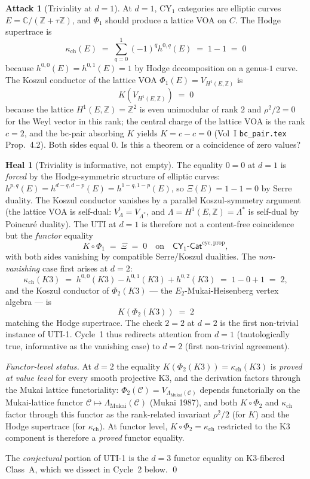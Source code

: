 \documentclass[11pt]{article}
\theoremstyle{definition}
\newtheorem{attack}[theorem]{Attack}
\newtheorem{heal}[theorem]{Heal}
\newcommand{\kch}{\kappa_{\mathrm{ch}}}
\begin{document}
\begin{attack}[Triviality at $d = 1$]
At $d = 1$, CY$_1$ categories are elliptic curves $E = \mathbb{C}/(\mathbb{Z}
+ \tau \mathbb{Z})$, and $\Phi_1$ should produce a lattice VOA on $C$.
The Hodge supertrace is
\[
   \kch(E) \;=\; \sum_{q=0}^{1} (-1)^q h^{0,q}(E)
           \;=\; 1 - 1 \;=\; 0
\]
because $h^{0,0}(E) = h^{0,1}(E) = 1$ by Hodge decomposition on a genus-$1$
curve. The Koszul conductor of the lattice VOA $\Phi_1(E) =
V_{H^1(E, \mathbb{Z})}$ is
\[
   K(V_{H^1(E, \mathbb{Z})}) \;=\; 0
\]
because the lattice $H^1(E, \mathbb{Z}) = \mathbb{Z}^2$ is even unimodular
of rank $2$ and $\rho^2 / 2 = 0$ for the Weyl vector in this rank; the
central charge of the lattice VOA is the rank $c = 2$, and the bc-pair
absorbing $K$ yields $K = c - c = 0$ (Vol~I \texttt{bc\_pair.tex}
Prop.~4.2). Both sides equal $0$. Is this a theorem or a coincidence of
zero values?
\end{attack}

\begin{heal}[Triviality is informative, not empty]
The equality $0 = 0$ at $d = 1$ is \emph{forced} by the Hodge-symmetric
structure of elliptic curves: $h^{p, q}(E) = h^{d-q, d-p}(E) = h^{1-q, 1-p}(E)$,
so $\Xi(E) = 1 - 1 = 0$ by Serre duality. The Koszul conductor
vanishes by a parallel Koszul-symmetry argument (the lattice VOA is
self-dual: $V_\Lambda^! = V_{\Lambda^*}$, and $\Lambda = H^1(E, \mathbb{Z})
= \Lambda^*$ is self-dual by Poincar\'e duality). The UTI at $d = 1$ is
therefore not a content-free coincidence but the \emph{functor} equality
\[
   K \circ \Phi_1 \;=\; \Xi \;=\; 0
   \quad\text{on}\quad
   \mathsf{CY}_1\text{-}\mathsf{Cat}^{\mathrm{cyc},\mathrm{prop}},
\]
with both sides vanishing by compatible Serre/Koszul dualities. The
\emph{non-vanishing} case first arises at $d = 2$:
\[
   \kch(K3) \;=\; h^{0,0}(K3) - h^{0,1}(K3) + h^{0,2}(K3) \;=\; 1 - 0 + 1
                                                            \;=\; 2,
\]
and the Koszul conductor of $\Phi_2(K3)$ --- the $E_2$-Mukai-Heisenberg
vertex algebra --- is
\[
   K(\Phi_2(K3)) \;=\; 2
\]
matching the Hodge supertrace. The check $2 = 2$ at $d = 2$ is the first
non-trivial instance of UTI-1. Cycle~1 thus redirects attention from
$d = 1$ (tautologically true, informative as the vanishing case) to
$d = 2$ (first non-trivial agreement).

\emph{Functor-level status.} At $d = 2$ the equality $K(\Phi_2(K3)) =
\kch(K3)$ is \emph{proved at value level} for every smooth projective K3,
and the derivation factors through the Mukai lattice functoriality:
$\Phi_2(\mathcal{C}) = V_{\Lambda_{\mathrm{Mukai}}(\mathcal{C})}$ depends
functorially on the Mukai-lattice functor $\mathcal{C} \mapsto
\Lambda_{\mathrm{Mukai}}(\mathcal{C})$ (Mukai 1987), and both $K \circ
\Phi_2$ and $\kch$ factor through this functor as the rank-related
invariant $\rho^2/2$ (for $K$) and the Hodge supertrace (for $\kch$). At
functor level, $K \circ \Phi_2 = \kch$ restricted to the K3 component is
therefore a \emph{proved} functor equality.

The \emph{conjectural} portion of UTI-1 is the $d = 3$ functor equality
on K3-fibered Class~A, which we dissect in Cycle~2 below.
\qed
\end{heal}
\end{document}
